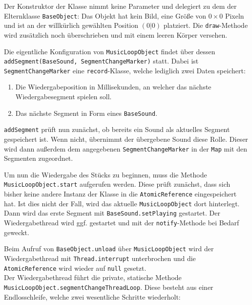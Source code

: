 \begin{sloppypar}
Der Konstruktor der Klasse nimmt keine Parameter und delegiert
zu dem der Elternklasse \texttt{BaseObject}: Das Objekt hat kein
Bild, eine Größe von $0 \times 0$ Pixeln und ist an der willkürlich
gewählten Position $(0|0)$ platziert. Die \texttt{draw}-Methode
wird zusätzlich noch überschrieben und mit einem leeren Körper
versehen.

Die eigentliche Konfiguration von \texttt{MusicLoopObject} findet
über dessen \texttt{addSegment(BaseSound, SegmentChangeMarker)}
statt. Dabei ist \texttt{SegmentChangeMarker} eine \texttt{record}-Klasse,
welche lediglich zwei Daten speichert:

\begin{enumerate}
	\item Die Wiedergabeposition in Millisekunden, an welcher das
	      nächste Wiedergabesegment spielen soll.
	\item Das nächste Segment in Form eines \texttt{BaseSound}.
\end{enumerate}

\texttt{addSegment} prüft nun zunächst, ob bereits ein Sound als
aktuelles Segment gespeichert ist. Wenn nicht, übernimmt der
übergebene Sound diese Rolle. Dieser wird dann außerdem dem
angegebenen \texttt{SegmentChangeMarker} in der \texttt{Map}
mit den Segmenten zugeordnet.

Um nun die Wiedergabe des Stücks zu beginnen, muss die Methode
\texttt{MusicLoopObject.start} aufgerufen werden. Diese prüft
zunächst, dass sich bisher keine andere Instanz der Klasse in
die \texttt{AtomicReference} eingespeichert hat. Ist dies nicht
der Fall, wird das aktuelle \texttt{MusicLoopObject} dort hinterlegt.
Dann wird das erste Segment mit \texttt{BaseSound.setPlaying}
gestartet. Der Wiedergabethread wird ggf. gestartet und mit der
\texttt{notify}-Methode bei Bedarf geweckt.

Beim Aufruf von \texttt{BaseObject.unload} über \texttt{MusicLoopObject}
wird der Wiedergabethread mit \texttt{Thread.interrupt} unterbrochen
und die \texttt{AtomicReference} wird wieder auf \texttt{null}
gesetzt.
\\

Der Wiedergabethread führt die private, statische Methode
\texttt{MusicLoopObject.segmentChangeThreadLoop}. Diese
besteht aus einer Endlosschleife, welche zwei wesentliche
Schritte wiederholt:


\end{sloppypar}
